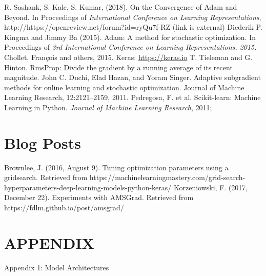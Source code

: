 \documentclass[letterpaper, 10 pt, conference]{ieeeconf}  %
\begin{document}
\begin{thebibliography}{99}
 R. Sashank, S. Kale, S. Kumar, (2018). On the Convergence of Adam and Beyond. In Proceedings of \emph{International Conference on Learning Representations}, http://https://openreview.net/forum?id=ryQu7f-RZ (link is external)
 Diederik P. Kingma and Jimmy Ba (2015). Adam: A method for stochastic optimization. In Proceedings
of \emph{3rd International Conference on Learning Representations, 2015.}
 Chollet, Fran\c{c}ois and others, 2015. Keras: \url{https://keras.io}
 T. Tieleman and G. Hinton. RmsProp: Divide the gradient by a running average of its recent magnitude.
 John C. Duchi, Elad Hazan, and Yoram Singer. Adaptive subgradient methods for online learning
and stochastic optimization. Journal of Machine Learning Research, 12:2121–2159, 2011.
 Pedregosa, F. et al. Scikit-learn: Machine Learning in Python. \emph{Journal of Machine Learning Research}, 2011;


\section*{Blog Posts}

 Brownlee, J. (2016, August 9). Tuning optimization parameters using a gridsearch. Retrieved from https://machinelearningmastery.com/grid-search-hyperparameters-deep-learning-models-python-keras/
 Korzeniowski, F. (2017, December 22). Experiments with AMSGrad. Retrieved from https://fdlm.github.io/post/amsgrad/

\end{thebibliography}
\newpage
\section{APPENDIX}
\large{Appendix 1: Model Architectures}
\end{document}

